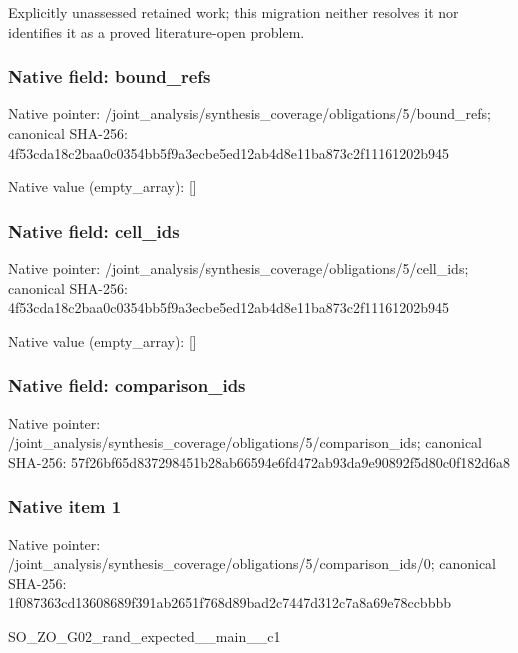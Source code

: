 \documentclass[10pt,a4paper]{article}
\begin{document}
\begingroup\raggedright\sloppy Explicitly unassessed retained work;\allowbreak{} this migration neither resolves it nor identifies it as a proved literature-open problem.\par\endgroup

\subsubsection{Native field: bound\_\allowbreak{}refs}
Native pointer: /joint\_\allowbreak{}analysis/synthesis\_\allowbreak{}coverage/obligations/5/bound\_\allowbreak{}refs; canonical SHA-256: 4f53cda18c2baa0c0354bb5f9a3ecbe5ed12ab4d8e11ba873c2f11161202b945

Native value (empty\_\allowbreak{}array): []

\subsubsection{Native field: cell\_\allowbreak{}ids}
Native pointer: /joint\_\allowbreak{}analysis/synthesis\_\allowbreak{}coverage/obligations/5/cell\_\allowbreak{}ids; canonical SHA-256: 4f53cda18c2baa0c0354bb5f9a3ecbe5ed12ab4d8e11ba873c2f11161202b945

Native value (empty\_\allowbreak{}array): []

\subsubsection{Native field: comparison\_\allowbreak{}ids}
Native pointer: /joint\_\allowbreak{}analysis/synthesis\_\allowbreak{}coverage/obligations/5/comparison\_\allowbreak{}ids; canonical SHA-256: 57f26bf65d837298451b28ab66594e6fd472ab93da9e90892f5d80c0f182d6a8

\subsubsection{Native item 1}
Native pointer: /joint\_\allowbreak{}analysis/synthesis\_\allowbreak{}coverage/obligations/5/comparison\_\allowbreak{}ids/0; canonical SHA-256: 1f087363cd13608689f391ab2651f768d89bad2c7447d312c7a8a69e78ccbbbb

\begingroup\raggedright\sloppy SO\_\allowbreak{}ZO\_\allowbreak{}G02\_\allowbreak{}rand\_\allowbreak{}expected\_\allowbreak{}\_\allowbreak{}main\_\allowbreak{}\_\allowbreak{}c1\par\endgroup
\end{document}
